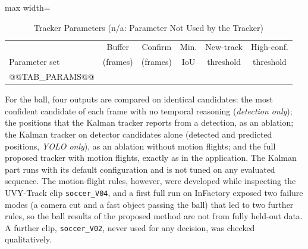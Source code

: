 \documentclass[conference]{IEEEtran}
\begin{document}
\begin{table}[t]
\caption{Tracker Parameters (n/a: Parameter Not Used by the Tracker)}
\label{tab:params}
\centering
\footnotesize
\setlength{\tabcolsep}{3pt}
\begin{adjustbox}{max width=\columnwidth}
\begin{tabular}{@{}lccccc@{}}
\toprule
 & Buffer & Confirm & Min. & New-track & High-conf. \\
Parameter set & (frames) & (frames) & IoU & threshold & threshold \\
\midrule
@@TAB_PARAMS@@
\bottomrule
\end{tabular}
\end{adjustbox}
\end{table}

For the ball, four outputs are compared on identical candidates: the most
confident candidate of each frame with no temporal reasoning (\emph{detection
only}); the positions that the Kalman tracker reports from a detection, as an
ablation; the Kalman tracker on detector candidates alone (detected and predicted
positions, \emph{YOLO only}), as an ablation without motion flights; and the full
proposed tracker with motion flights, exactly as in the application. The Kalman
part runs with its default configuration and is not tuned on any evaluated
sequence. The motion-flight rules, however, were developed while inspecting the
UVY-Track clip \texttt{soccer\_V04}, and a first full run on InFactory exposed two
failure modes (a camera cut and a fast object passing the ball) that led to two
further rules, so the ball results of the proposed method are not from fully
held-out data. A further clip, \texttt{soccer\_V02}, never used for any decision,
was checked qualitatively.
\end{document}
